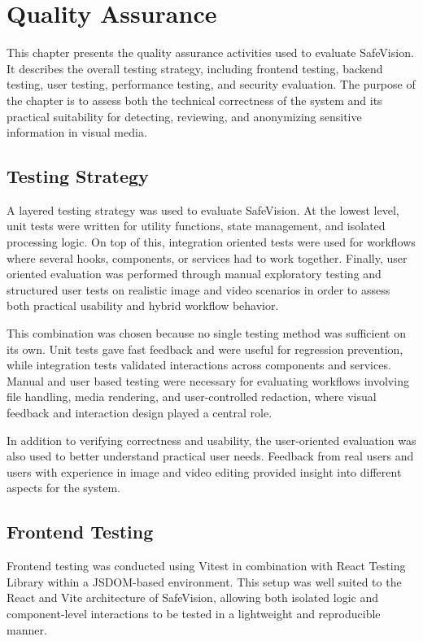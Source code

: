 \chapter{Quality Assurance}
\label{chap:testing_system_evaluation}

This chapter presents the quality assurance activities used to evaluate \gls{SafeVision}. It describes the overall testing strategy, including frontend testing, backend testing, user testing, performance testing, and security evaluation. The purpose of the chapter is to assess both the technical correctness of the system and its practical suitability for detecting, reviewing, and anonymizing sensitive information in visual media.


\section{Testing Strategy}

A layered testing strategy was used to evaluate \gls{SafeVision}. At the lowest level, unit tests were written for utility functions, state management, and isolated processing logic. On top of this, integration oriented tests were used for workflows where several hooks, components, or services had to work together. Finally, user oriented evaluation was performed through manual exploratory testing and structured user tests on realistic image and video scenarios in order to assess both practical usability and hybrid workflow behavior.

This combination was chosen because no single testing method was sufficient on its own. Unit tests gave fast feedback and were useful for regression prevention, while integration tests validated interactions across components and services. Manual and user based testing were necessary for evaluating workflows involving file handling, media rendering, and user-controlled redaction, where visual feedback and interaction design played a central role.

In addition to verifying correctness and usability, the user-oriented evaluation was also used to better understand practical user needs. Feedback from real users and users with experience in image and video editing provided insight into different aspects for the system.

\section{Frontend Testing}

Frontend testing was conducted using Vitest in combination with React Testing Library within a JSDOM-based environment. This setup was well suited to the React and Vite architecture of \gls{SafeVision}, allowing both isolated logic and component-level interactions to be tested in a lightweight and reproducible manner.

